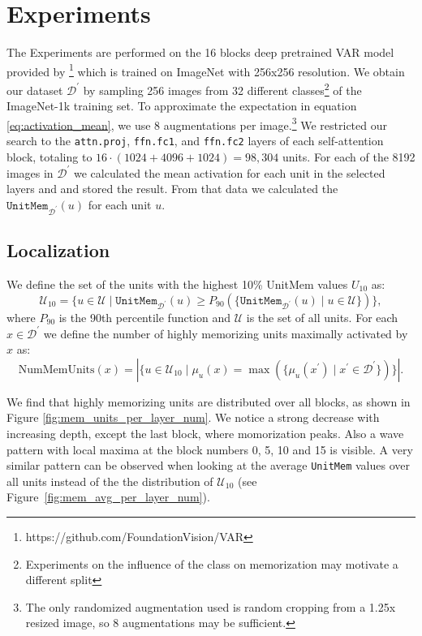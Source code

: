 \documentclass{article} %
\begin{document}
\section{Experiments}
The Experiments are performed on the 16 blocks deep pretrained VAR model provided by \citet{tianVisualAutoregressiveModeling2024}\footnote{https://github.com/FoundationVision/VAR} which is trained on ImageNet \citep{dengImageNetLargeScaleHierarchical2009a} with 256x256 resolution.
We obtain our dataset $\mathcal{D}^\prime$ by sampling 256 images from 32 different classes\footnote{Experiments on the influence of the class on memorization may motivate a different split} of the ImageNet-1k training set.
To approximate the expectation in equation \ref{eq:activation_mean}, we use 8 augmentations per image.\footnote{The only randomized augmentation used is random cropping from a 1.25x resized image, so 8 augmentations may be sufficient.}
We restricted our search to the \texttt{attn.proj}, \texttt{ffn.fc1}, and \texttt{ffn.fc2} layers of each self-attention block, totaling to $16\cdot (1024 + 4096 + 1024) = 98,304$ units.
For each of the 8192 images in $\mathcal{D}^\prime$ we calculated the mean activation for each unit in the selected layers and and stored the result.
From that data we calculated the $\texttt{UnitMem}_{\mathcal{D}^\prime}(u)$ for each unit $u$.
\subsection{Localization}
We define the set of the units with the highest 10\% UnitMem values $U_{10}$ as:
\begin{equation}\label{eq:mem_units}
   \mathcal{U}_{10} = \{u \in \mathcal{U} \mid\texttt{UnitMem}_{\mathcal{D}^\prime}(u) \geq P_{90}(\{\texttt{UnitMem}_{\mathcal{D}^\prime}(u) \mid u \in \mathcal{U}\})\},
\end{equation}
where $P_{90}$ is the 90th percentile function and $\mathcal{U}$ is the set of all units.
For each $x \in \mathcal{D}^\prime$ we define the number of highly memorizing units maximally activated by $x$ as:
\[\text{NumMemUnits}(x) = |\{u \in \mathcal{U}_{10} \mid \mu_u(x) = \max(\{\mu_u(x^\prime) \mid x^\prime \in \mathcal{D}^\prime\})\}|.\]

We find that highly memorizing units are distributed over all blocks, as shown in Figure \ref{fig:mem_units_per_layer_num}.
We notice a strong decrease with increasing depth, except the last block, where momorization peaks.
Also a wave pattern with local maxima at the block numbers 0, 5, 10 and 15 is visible.
A very similar pattern can be observed when looking at the average \texttt{UnitMem} values over all units instead of the the distribution of $\mathcal{U}_{10}$ (see Figure~\ref{fig:mem_avg_per_layer_num}).
\end{document}
